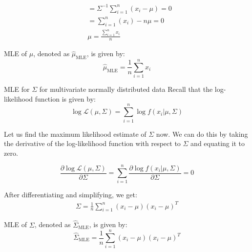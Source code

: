 \documentclass[handout]{beamer}
\begin{document}
\begin{frame}
    
    \begin{align*}
      &=\Sigma^{-1}\sum_{i=1}^n(x_i-\mu) = 0 \\
      &=\sum_{i=1}^n(x_i) - n\mu = 0 \\
      &\mu = \frac{\sum_{i=1}^n x_i}{n}      
    \end{align*} 

    \begin{tcolorbox}[colback=metropolisblue!5,colframe=metropolisblue,title=Maximum Likelihood Estimate for $\mu$]
        MLE of $\mu$, denoted as $\hat{\mu}_{\text{MLE}}$, is given by:
        \begin{equation*}
            \hat{\mu}_{\text{MLE}} = \frac{1}{n}\sum_{i=1}^n x_i
        \end{equation*}
    \end{tcolorbox}
    
\end{frame}

\begin{frame}{MLE for $\Sigma$ for multivariate normally distributed data}
    Recall that the log-likelihood function is given by:
    \begin{equation}
        \log \mathcal{L}(\mu, \Sigma) = \sum_{i=1}^n \log f(x_i|\mu, \Sigma)
    \end{equation}

    Let us find the maximum likelihood estimate of $\Sigma$ now. We can do this by taking the derivative of the log-likelihood function with respect to $\Sigma$ and equating it to zero.   

    \begin{equation}
        \frac{\partial \log \mathcal{L}(\mu, \Sigma)}{\partial \Sigma} = \sum_{i=1}^n \frac{\partial \log f(x_i|\mu, \Sigma)}{\partial \Sigma} = 0
    \end{equation}
    
\end{frame}
\begin{frame}
    After differentiating and simplifying, we get:
    \begin{align*}
      \Sigma = \frac{1}{n}\sum_{i=1}^n(x_i-\mu)(x_i-\mu)^T  
    \end{align*} 

    \begin{tcolorbox}[colback=metropolisblue!5,colframe=metropolisblue,title=Maximum Likelihood Estimate for $\Sigma$]
        MLE of $\Sigma$, denoted as $\hat{\Sigma}_{\text{MLE}}$, is given by:
        \begin{equation*}
            \hat{\Sigma}_{\text{MLE}} = \frac{1}{n}\sum_{i=1}^n (x_i-\mu)(x_i-\mu)^T
        \end{equation*}
    \end{tcolorbox}
\end{frame}
    
\end{document}
